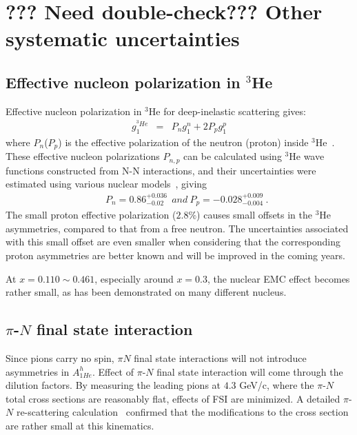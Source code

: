 \section{??? Need double-check??? Other systematic uncertainties}

\subsection{Effective nucleon polarization in $^3$He} \label{ch5:he3model}
Effective nucleon polarization in $^3$He for deep-inelastic scattering gives:
\begin{eqnarray}\label{equ:he3-g1n}
 g_1^{^3 {He}} &=& P_ng_1^n+2P_pg_1^p
\end{eqnarray}
where $P_n$($P_p$) is the effective polarization of the neutron 
(proton) inside $^3$He~\cite{theory:PnPp_friar}.
These effective nucleon polarizations $P_{n,p}$ can be
calculated using $^3$He wave functions constructed from N-N interactions,
and their uncertainties were estimated using various nuclear 
models~\cite{theory:PnPp_nogga,theory:PnPp_friar,theory:3Heconv,theory:PnPp_bissey},
giving 
\begin{eqnarray}
&& P_n=0.86^{+0.036}_{-0.02}~~{and}~P_p=-0.028^{+0.009}_{-0.004}~.\label{equ:PnPp}
\end{eqnarray}
%
The small proton effective polarization ($2.8 \%$) causes small 
offsets in the $^3$He asymmetries, compared to that from a 
free neutron.  The uncertainties associated with this small offset are even smaller
when considering that the corresponding proton asymmetries are better known
 and will be improved in the coming years.

At $x=0.110 \sim 0.461$, especially around $x=0.3$, the 
 nuclear EMC effect becomes rather small, as has been demonstrated 
on many different nucleus.

\subsection{$\pi$-$N$ final state interaction }
Since pions carry no spin,  $\pi N$ final state interactions will not introduce 
asymmetries in $A_{1He}^h$. Effect of $\pi$-$N$ final state interaction
will come through the dilution factors. By measuring the leading pions at
$4.3$ GeV/c, where the $\pi$-$N$ total cross sections are reasonably flat, 
effects of FSI are minimized. A detailed $\pi$-$N$ re-scattering calculation~\cite{misak}
confirmed that the modifications to the cross section are rather small at this kinematics.
 

